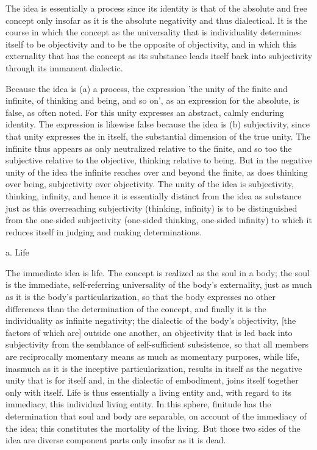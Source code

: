 The idea is essentially a process since its identity is
that of the absolute and free concept only insofar as
it is the absolute negativity and thus dialectical.
It is the course in which the concept
as the universality that is individuality
determines itself to be objectivity
and to be the opposite of objectivity,
and in which this externality
that has the concept as its substance leads
itself back into subjectivity
through its immanent dialectic.

Because the idea is (a) a process, the expression
'the unity of the finite and infinite,
of thinking and being, and so on',
as an expression for the absolute,
is false, as often noted.
For this unity expresses
an abstract, calmly enduring identity.
The expression is likewise false
because the idea is (b) subjectivity,
since that unity expresses the in itself,
the substantial dimension of the true unity.
The infinite thus appears as only
neutralized relative to the finite,
and so too the subjective relative to the objective,
thinking relative to being.
But in the negative unity of the idea
the infinite reaches over and beyond the finite,
as does thinking over being,
subjectivity over objectivity.
The unity of the idea is
subjectivity, thinking, infinity,
and hence it is essentially distinct
from the idea as substance
just as this overreaching subjectivity (thinking, infinity)
is to be distinguished from the one-sided subjectivity
(one-sided thinking, one-sided infinity)
to which it reduces itself in
judging and making determinations.

a. Life

The immediate idea is life.
The concept is realized as the soul in a body;
the soul is the immediate, self-referring universality of the body's externality,
just as much as it is the body's particularization, so that the body expresses
no other differences than the determination of the concept, and finally
it is the individuality as infinite negativity;
the dialectic of the body's objectivity,
[the factors of which are] outside one another,
an objectivity that is led back into subjectivity from the semblance of self-sufficient
subsistence, so that all members are reciprocally momentary means as
much as momentary purposes, while life, inasmuch as it is the inceptive
particularization, results in itself as the negative unity that is for itself and,
in the dialectic of embodiment, joins itself together only with itself.
Life is thus essentially a living entity and, with regard to its immediacy,
this individual living entity.
In this sphere, finitude has the determination that soul and body are separable,
on account of the immediacy of the idea;
this constitutes the mortality of the living.
But those two sides of the idea are diverse component parts
only insofar as it is dead.

